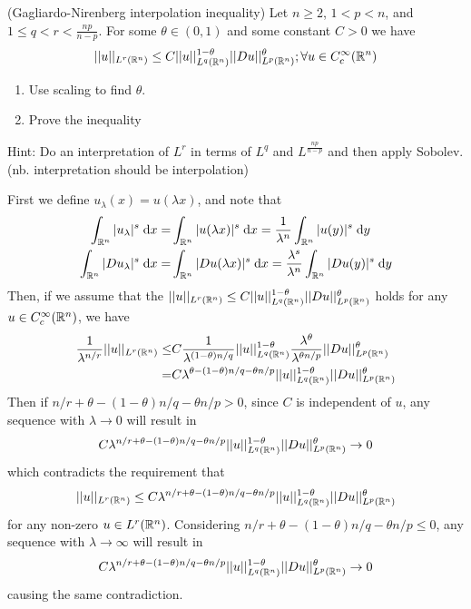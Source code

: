 (Gagliardo-Nirenberg interpolation inequality)
Let $n \geq 2$, $1 < p < n$, and $1 \leq q < r < \frac{n p}{n - p}$.
For some $\theta \in (0, 1)$ and some constant $C > 0$ we have
$$
||u||_{L^r(\mathbb{R}^n)} \leq C ||u||_{L^q(\mathbb{R}^n)}^{1 - \theta} ||D u||_{L^p(\mathbb{R}^n)}^{\theta}; \forall u \in C_c^\infty(\mathbb{R}^n)
$$

\begin{enumerate}
\item Use scaling to find $\theta$.
\item Prove the inequality
\end{enumerate}
Hint: Do an interpretation of $L^r$ in terms of $L^q$ and $L^{\frac{n p}{n - p}}$ and then apply Sobolev.
(nb. interpretation should be interpolation)

First we define $u_\lambda(x) = u(\lambda x)$, and note that
\begin{align*}
\int_{\mathbb{R}^n} |u_\lambda|^s \;\mathrm{d}x = &\int_{\mathbb{R}^n} |u(\lambda x)|^s \;\mathrm{d}x = \frac{1}{\lambda^n} \int_{\mathbb{R}^n} |u(y)|^s \;\mathrm{d}y\\
\int_{\mathbb{R}^n} |D u_\lambda|^s \;\mathrm{d}x = &\int_{\mathbb{R}^n} |D u(\lambda x)|^s \;\mathrm{d}x = \frac{\lambda^s}{\lambda^n} \int_{\mathbb{R}^n} |D u(y)|^s \;\mathrm{d}y\\
\end{align*}
Then, if we assume that the $||u||_{L^r(\mathbb{R}^n)} \leq C ||u||_{L^q(\mathbb{R}^n)}^{1 - \theta} ||D u||_{L^p(\mathbb{R}^n)}^{\theta}$
holds for any $u \in C_c^\infty(\mathbb{R}^n)$, we have
\begin{align*}
\frac{1}{\lambda^{n / r}} ||u||_{L^{r}(\mathbb{R}^n)} \leq &C \frac{1}{\lambda^{(1 - \theta) n / q}} ||u||_{L^{q}(\mathbb{R}^n)}^{1 - \theta} \frac{\lambda^{\theta}}{\lambda^{\theta n / p}} ||D u||_{L^p(\mathbb{R}^n)}^\theta\\
  = & C \lambda^{\theta - (1 - \theta) n / q - \theta n / p} ||u||_{L^{q}(\mathbb{R}^n)}^{1 - \theta} ||D u||_{L^p(\mathbb{R}^n)}^\theta
\end{align*}
Then if $n / r + \theta - (1 - \theta) n / q - \theta n / p > 0$, since $C$ is independent of $u$,
any sequence with $\lambda \rightarrow 0$ will result in
\begin{align*}
C \lambda^{n / r + \theta - (1 - \theta) n / q - \theta n / p} ||u||_{L^{q}(\mathbb{R}^n)}^{1 - \theta} ||D u||_{L^p(\mathbb{R}^n)}^\theta \rightarrow 0
\end{align*}
which contradicts the requirement that
\begin{align*}
||u||_{L^r(\mathbb{R}^n)} \leq C \lambda^{n / r + \theta - (1 - \theta) n / q - \theta n / p} ||u||_{L^{q}(\mathbb{R}^n)}^{1 - \theta} ||D u||_{L^p(\mathbb{R}^n)}^\theta
\end{align*}
for any non-zero $u \in L^r(\mathbb{R}^n)$.
Considering $n / r + \theta - (1 - \theta) n / q - \theta n / p \leq 0$,
any sequence with $\lambda \rightarrow \infty$ will result in
\begin{align*}
C \lambda^{n / r + \theta - (1 - \theta) n / q - \theta n / p} ||u||_{L^{q}(\mathbb{R}^n)}^{1 - \theta} ||D u||_{L^p(\mathbb{R}^n)}^\theta \rightarrow 0
\end{align*}
causing the same contradiction.

